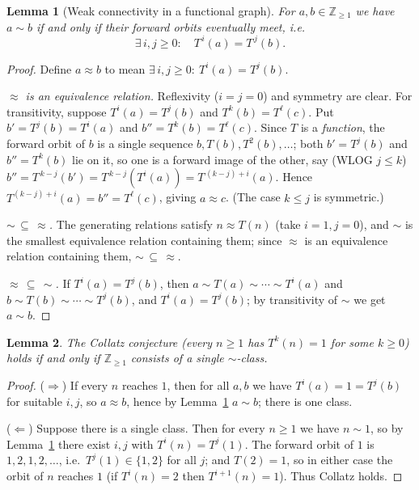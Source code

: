\documentclass{amsart}
\newtheorem{lemma}{Lemma}
\theoremstyle{remark}
\begin{document}
\begin{lemma}[Weak connectivity in a functional graph]\label{lem:wc}
For $a,b\in\mathbb{Z}_{\ge1}$ we have $a\sim b$ if and only if their forward orbits eventually
meet, i.e.
\[
\exists\, i,j\ge0:\quad T^{\,i}(a)=T^{\,j}(b).
\]
\end{lemma}
\begin{proof}
Define $a\approx b$ to mean $\exists\,i,j\ge0:\ T^i(a)=T^j(b)$.

\emph{$\approx$ is an equivalence relation.} Reflexivity ($i=j=0$) and symmetry are clear. For
transitivity, suppose $T^i(a)=T^j(b)$ and $T^k(b)=T^\ell(c)$. Put $b'=T^j(b)=T^i(a)$ and
$b''=T^k(b)=T^\ell(c)$. Since $T$ is a \emph{function}, the forward orbit of $b$ is a single
sequence $b,T(b),T^2(b),\dots$; both $b'=T^j(b)$ and $b''=T^k(b)$ lie on it, so one is a forward
image of the other, say (WLOG $j\le k$) $b''=T^{\,k-j}(b')=T^{\,k-j}(T^i(a))=T^{\,(k-j)+i}(a)$.
Hence $T^{(k-j)+i}(a)=b''=T^\ell(c)$, giving $a\approx c$. (The case $k\le j$ is symmetric.)

\emph{$\sim\,\subseteq\,\approx$.} The generating relations satisfy $n\approx T(n)$ (take
$i=1,j=0$), and $\sim$ is the smallest equivalence relation containing them; since $\approx$ is an
equivalence relation containing them, $\sim\,\subseteq\,\approx$.

\emph{$\approx\,\subseteq\,\sim$.} If $T^i(a)=T^j(b)$, then $a\sim T(a)\sim\cdots\sim T^i(a)$ and
$b\sim T(b)\sim\cdots\sim T^j(b)$, and $T^i(a)=T^j(b)$; by transitivity of $\sim$ we get
$a\sim b$.
\end{proof}

\begin{lemma}\label{lem:onesim}
The Collatz conjecture (every $n\ge1$ has $T^k(n)=1$ for some $k\ge0$) holds if and only if
$\mathbb{Z}_{\ge1}$ consists of a single $\sim$-class.
\end{lemma}
\begin{proof}
($\Rightarrow$) If every $n$ reaches $1$, then for all $a,b$ we have $T^i(a)=1=T^j(b)$ for suitable
$i,j$, so $a\approx b$, hence by Lemma~\ref{lem:wc} $a\sim b$; there is one class.

($\Leftarrow$) Suppose there is a single class. Then for every $n\ge1$ we have $n\sim 1$, so by
Lemma~\ref{lem:wc} there exist $i,j$ with $T^i(n)=T^j(1)$. The forward orbit of $1$ is
$1,2,1,2,\dots$, i.e.\ $T^j(1)\in\{1,2\}$ for all $j$; and $T(2)=1$, so in either case the orbit of
$n$ reaches $1$ (if $T^i(n)=2$ then $T^{i+1}(n)=1$). Thus Collatz holds.
\end{proof}
\end{document}
